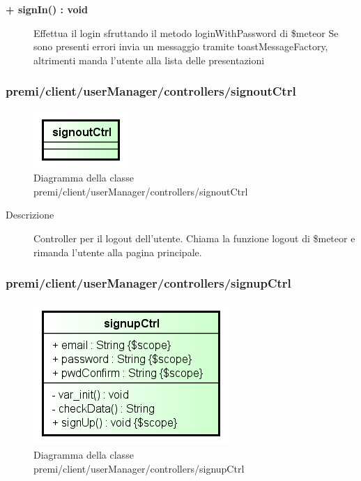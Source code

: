\begin{description}
	\begin{description}
		\item[\textbf{\color{blue}+ signIn() : void			}] \hfill
			Effettua il login sfruttando il metodo loginWithPassword di \$meteor
			Se sono presenti errori invia un messaggio tramite toastMessageFactory, altrimenti manda l'utente alla lista delle presentazioni
	\end{description}

\end{description}



\subsubsection{premi/client/userManager/controllers/signoutCtrl}
\begin{figure}[H]
\begin{center}
\includegraphics[scale=0.85]{img/diacla/signoutCtrl.png}
\caption{Diagramma della classe premi/client/userManager/controllers/signoutCtrl}
\end{center}
\end{figure}


\begin{description}
\item[Descrizione] \hfill
	Controller per il logout dell'utente. Chiama la funzione logout di \$meteor e rimanda l'utente alla pagina principale.
	
\end{description}





\subsubsection{premi/client/userManager/controllers/signupCtrl}
\begin{figure}[H]
\begin{center}
\includegraphics[scale=0.85]{img/diacla/signupCtrl.png}
\caption{Diagramma della classe premi/client/userManager/controllers/signupCtrl}
\end{center}
\end{figure}


